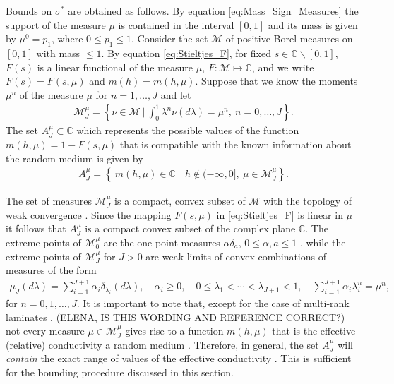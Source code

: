 \documentclass{cmslatex}
\begin{document}
Bounds on $\sigma^*$ are obtained as follows. By equation
\eqref{eq:Mass_Sign_Measures} the support of the measure $\mu$ is
contained in the interval $[0,1]$ and its mass is given by $\mu^0=p_1$,
where $0\leq p_1\leq1$. Consider the set $\mathscr{M}$ of positive Borel
measures on $[0,1]$ with mass $\leq1$. By equation
\eqref{eq:Stieltjes_F}, for fixed $s\in\mathbb{C}\backslash[0,1]$, $F(s)$ is a
linear functional of the measure $\mu$, $F:\mathscr{M}\mapsto\mathbb{C}$, and
we write $F(s)=F(s,\mu)$ and $m(h)=m(h,\mu)$. Suppose that we know the
moments $\mu^n$ of the measure $\mu$ for $n=1,\ldots,J$ and let
% 
\begin{align}\label{eq:Measure_Set}
  \mathscr{M}_J^\mu
     =\left\{\nu\in\mathscr{M} \ \Big| \   \int_0^1\lambda^n\nu(d\lambda)=\mu^n, \  n=0,\ldots,J\right\}  . 
\end{align}
%
The set $A_J^\mu\subset\mathbb{C}$ which represents the possible
values of the function $m(h,\mu)=1-F(s,\mu)$ that is compatible with the
known information about the random medium is given by
%
\begin{align}\label{eq:Bounding_Set}
  A_J^\mu
     =\left\{\ m(h,\mu)\in\mathbb{C} \ | \
       \ h\not\in(-\infty,0], \ \mu\in \mathscr{M}_J^\mu\right\}. 
\end{align}
%



The set of measures $\mathscr{M}_J^\mu$ is a compact, convex
subset of $\mathscr{M}$ with the topology of weak convergence
\cite{Golden:CMP-473}. Since the mapping $F(s,\mu)$ in
\eqref{eq:Stieltjes_F} is linear in $\mu$ it follows that
$A_J^\mu$ is a compact convex subset of the complex plane
$\mathbb{C}$. The extreme points of $\mathscr{M}_0^\mu$ are the one 
point measures $\alpha\delta_a$, $0\leq\alpha,a\leq1$ \cite{Dunford_Schwartz:LinOp_PtI},
while the extreme points of $\mathscr{M}_J^\mu$ for $J>0$ are weak limits
of convex combinations of measures of the form \cite{Golden:CMP-473} 
%
\begin{align}\label{eq:Discrete_Measure}
  \mu_J(d\lambda)=\sum_{i=1}^{J+1}\alpha_i\delta_{\lambda_i}(d\lambda), \quad
  \alpha_i\geq0, \quad 0\leq\lambda_1<\cdots<\lambda_{J+1}<1, \quad
  \sum_{i=1}^{J+1}\alpha_i\lambda_i^n=\mu^n,
\end{align}
%
for $n=0,1,\ldots,J$. It is important to note that, except for the case of 
multi-rank laminates \cite{MILTON:2002:TC}, (ELENA, IS THIS WORDING AND
REFERENCE CORRECT?) not every measure $\mu\in\mathscr{M}_J^\mu$ gives rise
to a function $m(h,\mu)$ that is the effective (relative) conductivity a
random medium \cite{Golden:CMP-473}. Therefore, in 
general, the set $A_J^\mu$ will \emph{contain} the exact range of values
of the effective conductivity \cite{Golden:CMP-473}. This is
sufficient for the bounding procedure discussed in this section.
\end{document}
